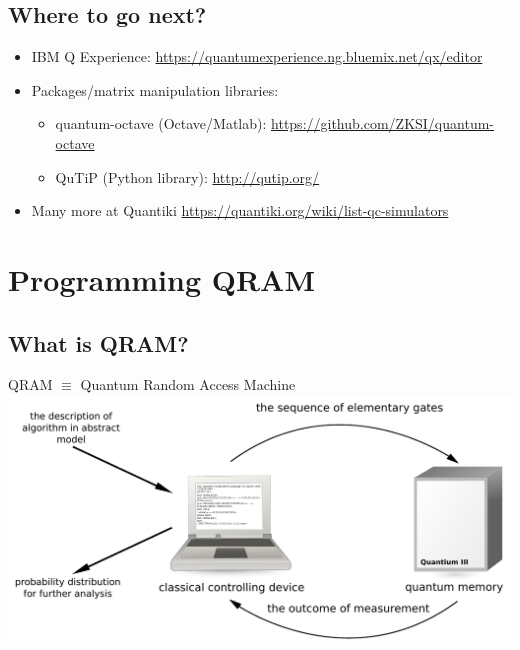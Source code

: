 \documentclass[a4paper,11pt]{article}
\begin{document}
\subsection{Where to go next?}

\begin{itemize}
\item IBM Q Experience: 
{\small\url{https://quantumexperience.ng.bluemix.net/qx/editor}}
\item Packages/matrix manipulation libraries:
\begin{itemize}
\item quantum-octave (Octave/Matlab): 
{\small \url{https://github.com/ZKSI/quantum-octave}}
\item QuTiP (Python library): {\small\url{http://qutip.org/}}
\end{itemize}
\item Many more at Quantiki 
\url{https://quantiki.org/wiki/list-qc-simulators}
\end{itemize}



\section{Programming QRAM}





\subsection{What is QRAM?}

\begin{center}
QRAM $\equiv$ Quantum Random Access Machine\\[12pt]
\includegraphics[width=\textwidth]{../slides/pics/qram}
\end{center}
\end{document}
